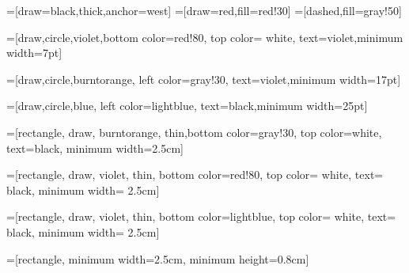 \usepackage{tikz}


\usetikzlibrary{trees,patterns,matrix,arrows,backgrounds}
=[draw=black,thick,anchor=west]
=[draw=red,fill=red!30]
=[dashed,fill=gray!50]


\def\firstcircle{(0:0) ellipse (4cm and 2.5cm)}
\def\secondcircle{(0:5cm) ellipse (4cm and 2.5cm)}
\def\thirdcircle{(310:4.2cm) ellipse (4cm and 2.5cm)}



\usepackage{pgfplots}
 \pgfplotsset{width=7cm,compat=1.3}
 \usepackage{pgfplotstable}

\usetikzlibrary{arrows,arrows.meta,chains,calc,trees,positioning}

\def\lav{red!80}
\def\oran{gray!30}

=[draw,circle,violet,bottom color=\lav,
top color= white, text=violet,minimum width=7pt]

=[draw,circle,burntorange, left color=\oran,
text=violet,minimum width=17pt]

=[draw,circle,blue, left color=lightblue,
text=black,minimum width=25pt]

=[rectangle, draw, burntorange,
thin,bottom color=\oran, top color=white,
text=black, minimum width=2.5cm]

=[rectangle, draw, violet,  thin,
bottom color=\lav, top color= white,
text= black, minimum width= 2.5cm]

=[rectangle, draw, violet,  thin,
bottom color=lightblue, top color= white,
text= black, minimum width= 2.5cm]

=[rectangle, 
minimum width=2.5cm, minimum height=0.8cm]





